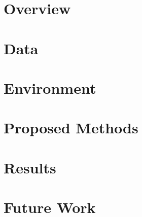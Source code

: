 \documentclass[12pt]{article}
\begin{document}
\maketitle

\section{Overview}
\section{Data}
\section{Environment}
\section{Proposed Methods}
\section{Results}
\section{Future Work}
\end{document}
